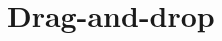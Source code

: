 \documentclass[a4paper,12pt]{report}
\begin{document}
\section{Drag-and-drop}\label{appendix:drag_and_drop}%









\end{document}
